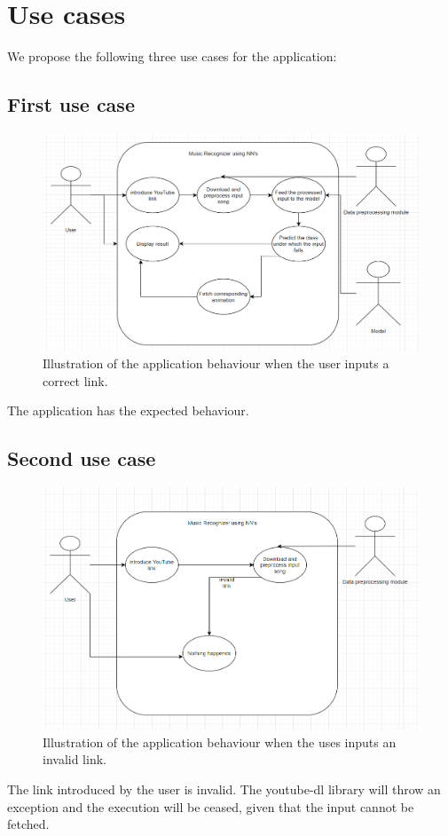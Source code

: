 \chapter{Use cases}

We propose the following three use cases for the application:

\section{First use case}

\begin{figure}[H]
	\centering
	\includegraphics[width = 4.5in]{images/usecase1.png}
	\caption{Illustration of the application behaviour when the user inputs a correct link.}
	\label{uc1}
	\end{figure}
The application has the expected behaviour.
\section{Second use case}
\begin{figure}[H]
	\centering
	\includegraphics[width = 4.5in]{images/usecase3.png}
	\caption{Illustration of the application behaviour when the uses inputs an invalid link. }
	\label{uc3}
	\end{figure}
The link introduced by the user is invalid. The youtube-dl library will throw an exception and the execution will be ceased, given that the input cannot be fetched.

